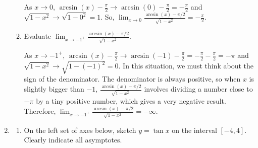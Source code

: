 \documentclass{article}
\begin{document}
\begin{enumerate}
\begin{enumerate}
    \begin{solution}
      As $x \to 0$, $\arcsin(x) - \frac{\pi}{2} \to \arcsin(0) -
      \frac{\pi}{2} = - \frac{\pi}{2}$ and $\sqrt{1 - x^2} \to \sqrt{1 -
        0^2} = 1$.  So, $\displaystyle \lim_{x \to 0} \frac{\arcsin (x)
        -\pi/2}{\sqrt{1-x^2}} = \boxed{- \frac{\pi}{2}}$.       
    \end{solution}

  \item
    \begin{problem}[\vfill]
      Evaluate $\displaystyle \lim_{x\rightarrow -1^+}\frac{\arcsin (x)
        -\pi/2}{\sqrt{1-x^2}}.$
    \end{problem}

    \begin{solution}
      As $x \to -1^+$, $\arcsin(x) - \frac{\pi}{2} \to \arcsin (-1) -
      \frac{\pi}{2} = - \frac{\pi}{2} - \frac{\pi}{2} = - \pi$ and
      $\sqrt{1 - x^2} \to \sqrt{1 - (-1)^2} = 0$.  In this situation, we
      must think about the sign of the denominator.  The denominator is
      always positive, so when $x$ is slightly bigger than $-1$,
      $\displaystyle \frac{\arcsin (x) -\pi/2}{\sqrt{1-x^2}}$ involves
      dividing a number close to $-\pi$ by a tiny positive number, which
      gives a very negative result.  Therefore, $\displaystyle \lim_{x \to
        -1^+} \frac{\arcsin (x) -\pi/2}{\sqrt{1-x^2}} = \boxed{-\infty}$.
    \end{solution}



  \end{enumerate}

\item \label{spring2011-mb-final-7}   



  \begin{enumerate}
  \item 
    \begin{problem}[\vfill]
      On the left set of axes below, sketch $y = \tan x$ on the interval
      $[-4, 4]$.  Clearly indicate all asymptotes.
    \end{problem}

    \begin{problemonly}
      \axes[xtick={-4, -3, ..., 4}, ytick={-4, -3, ..., 4}, xmin=-4,
      ymin=-4, xmax=4.5, ymax=4.5, width=3.25in, height=3.25in]
      \hspace{0.25in}      
      \axes[xtick={-8, -6, ..., 8}, minor xtick={-7, -5, ..., 7},
      ytick=\empty, xmin=-8, xmax=8.5, width=3.25in, height=3.25in]      
    \end{problemonly}


\end{enumerate}
\end{enumerate}
\end{document}
